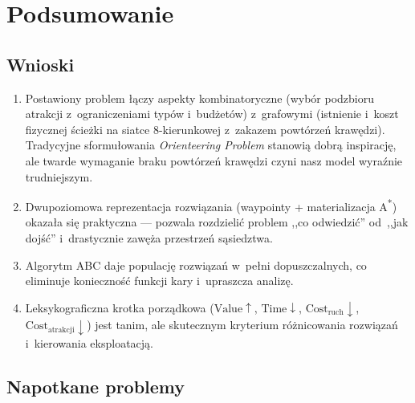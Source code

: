 \section{Podsumowanie}
\label{sec:podsumowanie}

\subsection{Wnioski}

\begin{enumerate}
    \item Postawiony problem łączy aspekty kombinatoryczne (wybór podzbioru
          atrakcji z~ograniczeniami typów i~budżetów) z~grafowymi
          (istnienie i~koszt fizycznej ścieżki na siatce 8-kierunkowej
          z~zakazem powtórzeń krawędzi). Tradycyjne sformułowania
          \emph{Orienteering Problem} stanowią dobrą inspirację, ale
          twarde wymaganie braku powtórzeń krawędzi czyni nasz model
          wyraźnie trudniejszym.
    \item Dwupoziomowa reprezentacja rozwiązania (waypointy + materializacja
          A\textsuperscript{*}) okazała się praktyczna --- pozwala
          rozdzielić problem ,,co odwiedzić'' od~,,jak dojść''
          i~drastycznie zawęża przestrzeń sąsiedztwa.
    \item Algorytm ABC daje populację rozwiązań w~pełni dopuszczalnych,
          co eliminuje konieczność funkcji kary i~upraszcza analizę.
    \item Leksykograficzna krotka porządkowa
          ($\mathrm{Value}\uparrow$, $\mathrm{Time}\downarrow$,
          $\mathrm{Cost}_{\mathrm{ruch}}\downarrow$,
          $\mathrm{Cost}_{\mathrm{atrakcji}}\downarrow$) jest tanim, ale
          skutecznym kryterium różnicowania rozwiązań i~kierowania
          eksploatacją.
\end{enumerate}

\subsection{Napotkane problemy}


